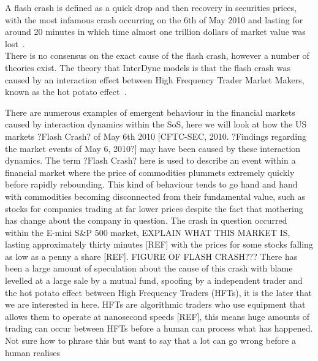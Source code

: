 \documentclass{article}
\begin{document}
A flash crash is defined as a quick drop and then recovery in securities prices, with the most infamous  crash occurring on the 6th of May 2010 and lasting for around 20 minutes in which time almost one trillion dollars of market value was lost~\cite{Vikram_Paper}.\\
There is no consensus on the exact cause of the flash crash, however a number of theories exist. The theory that InterDyne models is that the flash crash was caused by an interaction effect between High Frequency Trader Market Makers, known as the hot potato effect~\cite{Elias_Paper}. 



There are numerous examples of emergent behaviour in the financial markets caused by interaction dynamics within the SoS, here we will look at how the US markets ?Flash Crash? of May 6th 2010 [CFTC-SEC, 2010. ?Findings regarding the market events of May 6, 2010?] may have been caused by these interaction dynamics. 
The term ?Flash Crash? here is used to describe an event within a financial market where the price of commodities plummets extremely quickly before rapidly rebounding. This kind of behaviour tends to go hand and hand with commodities becoming disconnected from their fundamental value, such as stocks for companies trading at far lower prices despite the fact that mothering has change about the company in question.
The crash in question occurred within the E-mini S&P 500 market, EXPLAIN WHAT THIS MARKET IS, lasting approximately thirty minutes [REF] with the prices for some stocks falling as low as a penny a share [REF].
FIGURE OF FLASH CRASH??? 
There has been a large amount of speculation about the cause of this crash with blame levelled at a large sale by a mutual fund, spoofing by a independent trader and the hot potato effect between High Frequency Traders (HFTs), it is the later that we are interested in here.
HFTs are algorithmic traders who use equipment that allows them to operate at nanosecond speeds [REF], this means huge amounts of trading can occur between HFTs before a human can process what has happened.  Not sure how to phrase this but want to say that a lot can go wrong before a human realises 
\end{document}
